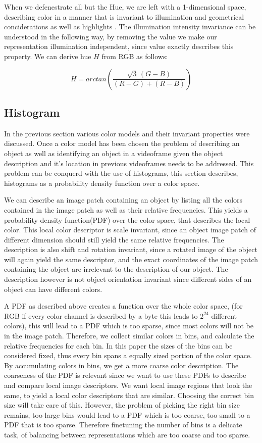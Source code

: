 \documentclass[a4paper,11pt]{article}
\begin{document}
When we defenestrate all but the Hue, we are left with a 1-dimensional space, describing color in a manner that is invariant to illumination and geometrical conciderations as well as highlights \cite{gevers_invariant}. The illumination intensity invariance can be understood in the following way, by removing the value we make our representation illumination independent, since value exactly describes this property. We can derive hue $H$ from RGB as follows:

\begin{equation}
\label{eq:hue}
H = arctan\left(\frac{\sqrt{3}\,(G-B)}{(R-G)+(R-B)}\right)
\end{equation} 
		 
\subsection{Histogram}
In the previous section various color models and their invariant properties were discussed. Once a color model has been chosen the problem of describing an object as well as identifying an object in a videoframe given the object description and it's location in previous videoframes needs to be addressed. This problem can be conquerd with the use of histograms, this section describes, histograms as a probability density function over a color space. 

We can describe an image patch containing an object by listing all the colors contained in the image patch as well as their relative frequencies. This yields a probability density function(PDF) over the color space, that describes the local color. This local color descriptor is scale invariant, since an object image patch of different dimension should still yield the same relative frequencies. The description is also shift and rotation invariant, since a rotated image of the object will again yield the same descriptor, and the exact coordinates of the image patch containing the object are irrelevant to the description of our object. The description however is not object orientation invariant since different sides of an object can have different colors. 

A PDF as described above creates a function over the whole color space, (for RGB if every color channel is described by a byte this leads to $2^{24}$ different colors), this will lead to a PDF which is too sparse, since most colors will not be in the image patch. Therefore, we collect similar colors in bins, and calculate the relative frequencies for each bin. In this paper the sizes of the bins can be considered fixed, thus every bin spans a equally sized portion of the color space. By accumulating colors in bins, we get a more coarse color description. The coarseness of the PDF is relevant since we want to use these PDFs to describe and compare local image descriptors. We want local image regions that look the same, to yield a local color descriptors that are similar.  Choosing the correct bin size will take care of this. However, the problem of picking the right bin size remains, too large bins would lead to a PDF which is too coarse, too small to a PDF that is too sparse. Therefore finetuning the number of bins is a delicate task, of balancing between representations which are too coarse and too sparse.  
\end{document}
